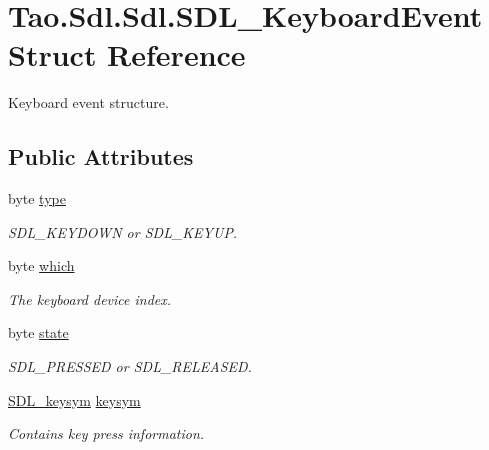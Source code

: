 \hypertarget{struct_tao_1_1_sdl_1_1_sdl_1_1_s_d_l___keyboard_event}{
\section{Tao.Sdl.Sdl.SDL\_\-KeyboardEvent Struct Reference}
\label{struct_tao_1_1_sdl_1_1_sdl_1_1_s_d_l___keyboard_event}
}


Keyboard event structure.  


\subsection*{Public Attributes}
\begin{DoxyCompactItemize}
\item 
byte \hyperlink{struct_tao_1_1_sdl_1_1_sdl_1_1_s_d_l___keyboard_event_ad75c476fd7d0b3a6100e58cb3538984c}{type}
\begin{DoxyCompactList}\small\item\em SDL\_\-KEYDOWN or SDL\_\-KEYUP. \item\end{DoxyCompactList}\item 
byte \hyperlink{struct_tao_1_1_sdl_1_1_sdl_1_1_s_d_l___keyboard_event_aee0d1eb02947a6037bb20d049d5893c6}{which}
\begin{DoxyCompactList}\small\item\em The keyboard device index. \item\end{DoxyCompactList}\item 
byte \hyperlink{struct_tao_1_1_sdl_1_1_sdl_1_1_s_d_l___keyboard_event_a3d1da595fe959e927580c85b5e710b63}{state}
\begin{DoxyCompactList}\small\item\em SDL\_\-PRESSED or SDL\_\-RELEASED. \item\end{DoxyCompactList}\item 
\hyperlink{struct_tao_1_1_sdl_1_1_s_d_l__keysym}{SDL\_\-keysym} \hyperlink{struct_tao_1_1_sdl_1_1_sdl_1_1_s_d_l___keyboard_event_ad6998ba475cab7e1e3743fc5a988e650}{keysym}
\begin{DoxyCompactList}\small\item\em Contains key press information. \item\end{DoxyCompactList}\end{DoxyCompactItemize}


